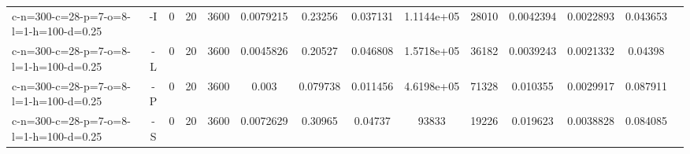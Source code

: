 \documentclass[landscape, a4paper]{article}
\begin{document}
\begin{center}
\begin{tabular}{lccccccccccccc}
c-n=300-c=28-p=7-o=8-l=1-h=100-d=0.25 & -I & 0 & 20 & 3600 & 0.0079215 & 0.23256 & 0.037131 & 1.1144e+05 & 28010 & 0.0042394 & 0.0022893 & 0.043653 & \\
c-n=300-c=28-p=7-o=8-l=1-h=100-d=0.25 & -L & 0 & 20 & 3600 & 0.0045826 & 0.20527 & 0.046808 & 1.5718e+05 & 36182 & 0.0039243 & 0.0021332 & 0.04398 & \\
c-n=300-c=28-p=7-o=8-l=1-h=100-d=0.25 & -P & 0 & 20 & 3600 & 0.003 & 0.079738 & 0.011456 & 4.6198e+05 & 71328 & 0.010355 & 0.0029917 & 0.087911 & \\
c-n=300-c=28-p=7-o=8-l=1-h=100-d=0.25 & -S & 0 & 20 & 3600 & 0.0072629 & 0.30965 & 0.04737 & 93833 & 19226 & 0.019623 & 0.0038828 & 0.084085 & \\
\end{tabular}
\end{center}
\end{document}
